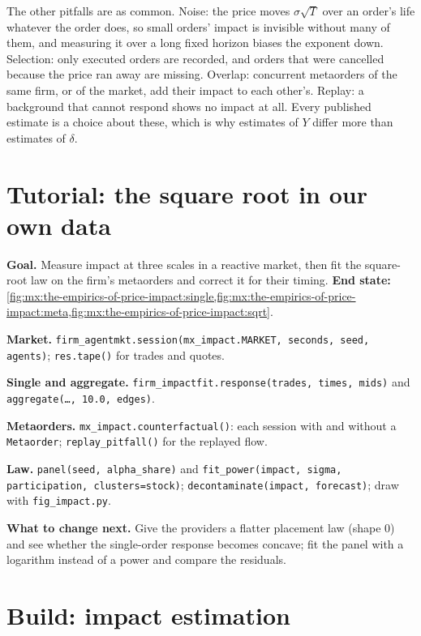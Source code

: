 The other pitfalls are as common. Noise: the price moves $\sigma\sqrt T$ over an order's life whatever the order does, so small orders' impact is
invisible without many of them, and measuring it over a long fixed horizon biases the exponent down. Selection: only executed orders are recorded, and
orders that were cancelled because the price ran away are missing. Overlap: concurrent metaorders of the same firm, or of the market, add their impact to
each other's. Replay: a background that cannot respond shows no impact at all. Every published estimate is a choice about these, which is why
estimates of $Y$ differ more than estimates of $\delta$.

\section{Tutorial: the square root in our own data}\label{tut:mx:the-empirics-of-price-impact:tut}

\begin{tutorial}
\textbf{Goal.} Measure impact at three scales in a reactive market, then fit the square-root law on the firm's metaorders and correct it for their timing.
\textbf{End state:} \cref{fig:mx:the-empirics-of-price-impact:single,fig:mx:the-empirics-of-price-impact:meta,fig:mx:the-empirics-of-price-impact:sqrt}.
\begin{tutsteps}
\item \textbf{Market.} \texttt{firm\_agentmkt.session(mx\_impact.MARKET, seconds, seed, agents)}; \texttt{res.tape()} for trades and quotes.
\item \textbf{Single and aggregate.} \texttt{firm\_impactfit.response(trades, times, mids)} and \texttt{aggregate(\dots, 10.0, edges)}.
\item \textbf{Metaorders.} \texttt{mx\_impact.counterfactual()}: each session with and without a \texttt{Metaorder}; \texttt{replay\_pitfall()} for the
replayed flow.
\item \textbf{Law.} \texttt{panel(seed, alpha\_share)} and \texttt{fit\_power(impact, sigma, participation, clusters=stock)};
\texttt{decontaminate(impact, forecast)}; draw with \texttt{fig\_impact.py}.
\end{tutsteps}
\textbf{What to change next.} Give the providers a flatter placement law (shape 0) and see whether the single-order response becomes concave; fit the
panel with a logarithm instead of a power and compare the residuals.
\end{tutorial}

\section{Build: impact estimation}\label{bld:mx:the-empirics-of-price-impact:impactfit}

